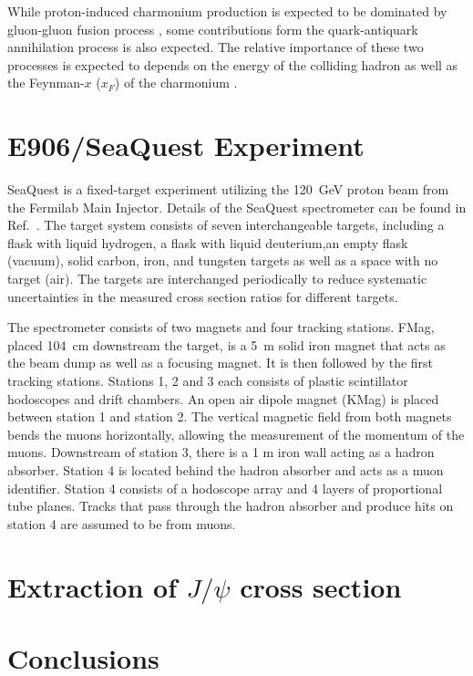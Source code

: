 \documentclass[10pt, a4paper]{article}
\begin{document}
While proton-induced charmonium production is expected to be dominated by gluon-gluon
fusion process \cite{vogt1999}, some contributions form the quark-antiquark
annihilation process is also expected. The relative importance of these two
processes is expected to depends on the energy of the colliding hadron as well
as the Feynman-$x$ ($x_F$) of the charmonium \cite{peng1995}.

\section{E906/SeaQuest Experiment}
\label{sec:e906}
SeaQuest is a fixed-target experiment utilizing the \SI{120}{\GeV} proton beam
from the Fermilab Main Injector. Details of the SeaQuest spectrometer can be
found in Ref.~\cite{aidala2019}. The target system consists of seven
interchangeable targets, including a flask with liquid hydrogen, a flask with
liquid deuterium,an empty flask (vacuum), solid carbon, iron, and tungsten
targets as well as a space with no target (air). The targets are interchanged
periodically to reduce systematic uncertainties in the measured cross section
ratios for different targets.

The spectrometer consists of two magnets and four tracking stations. FMag,
placed \SI{104}{\cm} downstream the target, is a \SI{5}{\m} solid iron magnet
that acts as the beam dump as well as a focusing magnet. It is then followed by
the first tracking stations. Stations 1, 2 and 3 each consists of plastic
scintillator hodoscopes and drift chambers. An open air dipole magnet (KMag) is
placed between station 1 and station 2. The vertical magnetic field from both
magnets bends the muons horizontally, allowing the measurement of the momentum
of the muons. Downstream of station 3, there is a 1 m iron wall acting as a
hadron absorber. Station 4 is located behind the hadron absorber and acts as a
muon identifier. Station 4 consists of a hodoscope array and 4 layers of
proportional tube planes. Tracks that pass through the hadron absorber and
produce hits on station 4 are assumed to be from muons.

\section{Extraction of \texorpdfstring{$J/\psi$}{J/psi} cross section}
\label{sec:result}



\section{Conclusions}


\printbibliography[heading=bibintoc,title={References}]
\listoftodos 
\end{document}
